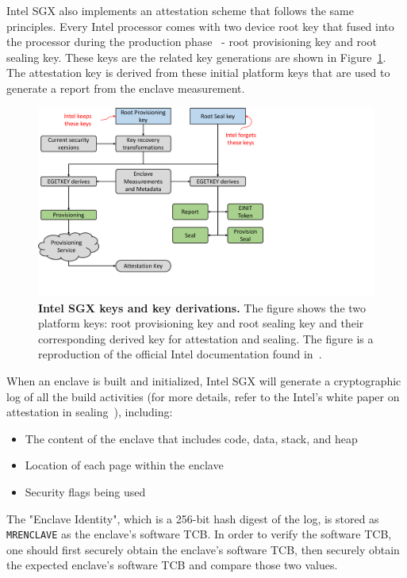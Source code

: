 Intel SGX also implements an attestation scheme that follows the same principles. Every Intel processor comes with two device root key that fused into the processor during the production phase~\cite{attestation_primitive} -  root provisioning key and root sealing key. These keys are the related key generations are shown in Figure~\ref{fig:keys_bg}. The attestation key is derived from these initial platform keys that are used to generate a report from the enclave measurement.


\begin{figure}[t]
  \centering
    \includegraphics[trim={0 1cm 10cm 0},clip,width=0.9\linewidth]{chapters/background/figures/keys.pdf}
    \caption[Intel SGX keys and key derivations]{\textbf{Intel SGX keys and key derivations.} The figure shows the two platform keys: root provisioning key and root sealing key and their corresponding derived key for attestation and sealing. The figure is a reproduction of the official Intel documentation found in~\cite{attestation_primitive}.}
    \label{fig:keys_bg}
\end{figure}


 When an enclave is built and initialized, Intel SGX will generate a cryptographic log of all the build activities (for more details, refer to the Intel's white paper on attestation in sealing~\cite{attestation_primitive_all}), including:

\begin{itemize}
  \item The content of the enclave that includes code, data, stack, and heap
  \item Location of each page within the enclave
  \item Security flags being used
\end{itemize}
    
The "Enclave Identity", which is a 256-bit hash digest of the log, is stored as \texttt{MRENCLAVE} as the enclave's software TCB. In order to verify the software TCB, one should first securely obtain the enclave's software TCB, then securely obtain the expected enclave's software TCB and compare those two values.

